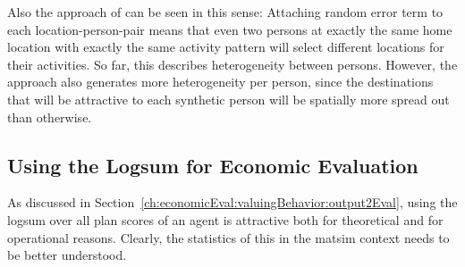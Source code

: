 Also the approach of \cite[][, also see Chapter~\ref{ch:destinationchoice} of this book]{Horni_PhDThesis_2013} can be seen in this sense: Attaching random error term to each location-person-pair means that even two persons at exactly the same home location with exactly the same activity pattern will select different locations for their activities.  So far, this describes heterogeneity between persons.  However, the approach also generates more heterogeneity per person, since the destinations that will be attractive to each synthetic person will be spatially more spread out than otherwise.

\subsection{Using the Logsum for Economic Evaluation}
\label{sec:using-logsum-4-eval}

As discussed in Section~\ref{ch:economicEval:valuingBehavior:output2Eval}, using the \gls{logsum} over all plan scores of an agent is attractive both for theoretical and for operational reasons.  Clearly, the statistics of this in the \gls{matsim} context needs to be better understood.

